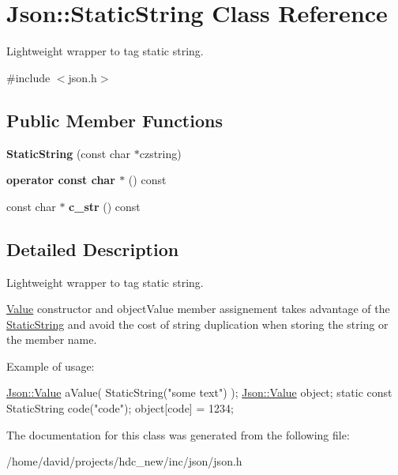 \hypertarget{class_json_1_1_static_string}{}\section{Json\+:\+:Static\+String Class Reference}
\label{class_json_1_1_static_string}


Lightweight wrapper to tag static string.  




{\ttfamily \#include $<$json.\+h$>$}

\subsection*{Public Member Functions}
\begin{DoxyCompactItemize}
\item 
{\bfseries Static\+String} (const char $\ast$czstring)\hypertarget{class_json_1_1_static_string_afb6baf1ec078ce76f0b0f9b39d19437f}{}\label{class_json_1_1_static_string_afb6baf1ec078ce76f0b0f9b39d19437f}

\item 
{\bfseries operator const char $\ast$} () const \hypertarget{class_json_1_1_static_string_ac2b334d46bbea4c0227e508fc66433e9}{}\label{class_json_1_1_static_string_ac2b334d46bbea4c0227e508fc66433e9}

\item 
const char $\ast$ {\bfseries c\+\_\+str} () const \hypertarget{class_json_1_1_static_string_ab86fc6a3183adf12fdba4b370acf1754}{}\label{class_json_1_1_static_string_ab86fc6a3183adf12fdba4b370acf1754}

\end{DoxyCompactItemize}


\subsection{Detailed Description}
Lightweight wrapper to tag static string. 

\hyperlink{class_json_1_1_value}{Value} constructor and object\+Value member assignement takes advantage of the \hyperlink{class_json_1_1_static_string}{Static\+String} and avoid the cost of string duplication when storing the string or the member name.

Example of usage\+: 
\begin{DoxyCode}
\hyperlink{class_json_1_1_value}{Json::Value} aValue( StaticString(\textcolor{stringliteral}{"some text"}) );
\hyperlink{class_json_1_1_value}{Json::Value} object;
\textcolor{keyword}{static} \textcolor{keyword}{const} StaticString code(\textcolor{stringliteral}{"code"});
\textcolor{keywordtype}{object}[code] = 1234;
\end{DoxyCode}
 

The documentation for this class was generated from the following file\+:\begin{DoxyCompactItemize}
\item 
/home/david/projects/hdc\+\_\+new/inc/json/json.\+h\end{DoxyCompactItemize}
